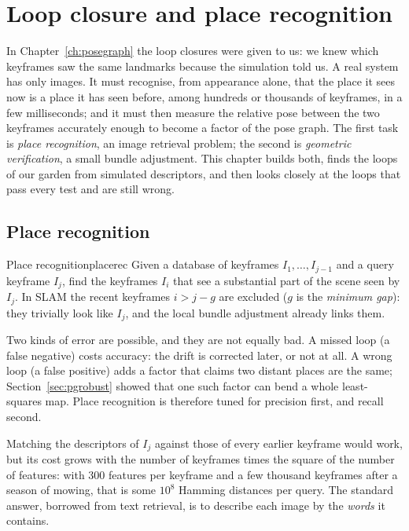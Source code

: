 \chapter{Loop closure and place recognition}
\label{ch:loop}

In Chapter~\ref{ch:posegraph} the loop closures were given to us: we
knew which keyframes saw the same landmarks because the simulation
told us. A real system has only images. It must recognise, from
appearance alone, that the place it sees now is a place it has seen
before, among hundreds or thousands of keyframes, in a few
milliseconds; and it must then measure the relative pose between the
two keyframes accurately enough to become a factor of the pose graph.
The first task is \emph{place recognition}, an image retrieval problem;
the second is \emph{geometric verification}, a small bundle adjustment.
This chapter builds both, finds the loops of our garden from simulated
descriptors, and then looks closely at the loops that pass every test
and are still wrong.

\section{Place recognition}

\begin{definition}{Place recognition}{placerec}
Given a database of keyframes $I_1,\dots,I_{j-1}$ and a query keyframe
$I_j$, find the keyframes $I_i$ that see a substantial part of the
scene seen by $I_j$. In SLAM the recent keyframes $i>j-g$ are excluded
($g$ is the \emph{minimum gap}): they trivially look like $I_j$, and
the local bundle adjustment already links them.
\end{definition}

Two kinds of error are possible, and they are not equally bad. A missed
loop (a false negative) costs accuracy: the drift is corrected later,
or not at all. A wrong loop (a false positive) adds a factor that
claims two distant places are the same; Section~\ref{sec:pgrobust}
showed that one such factor can bend a whole least-squares map.
Place recognition is therefore tuned for precision first, and recall
second.

Matching the descriptors of $I_j$ against those of every earlier
keyframe would work, but its cost grows with the number of keyframes
times the square of the number of features: with 300 features per
keyframe and a few thousand keyframes after a season of mowing, that is
some $10^8$ Hamming distances per query. The standard answer, borrowed
from text retrieval, is to describe each image by the \emph{words} it
contains.

